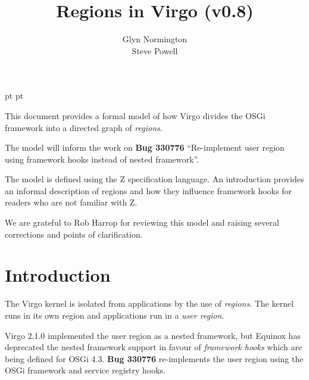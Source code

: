 \documentclass[a4paper,9pt]{article}
\begin{document}
 pt
 pt

\title{Regions in Virgo (v0.8)}
\author{Glyn Normington\\Steve Powell}

\maketitle
\thispagestyle{myheadings}
\setcounter{page}{0}

This document provides a formal model of how Virgo divides the OSGi framework into a directed graph
of \textit{regions}.

The model will inform the work on \textbf{Bug 330776} ``Re-implement user region using
framework hooks instead of nested framework''.

The model is defined using the Z specification language. An introduction provides an informal
description of regions and how they influence framework hooks for readers who are not familiar with Z.

We are grateful to Rob Harrop for reviewing this model and raising several corrections and
points of clarification.

\clearpage
{}
\tableofcontents

\newcommand{\true}{true}
\newcommand{\false}{false}
\renewcommand{\emptyset}{\varnothing}
\newcommand{\ModuleDefZero}{ModuleDef_0}
\newcommand{\ModuleDefOne}{ModuleDef_1}
\newcommand{\ModuleDefTwo}{ModuleDef_2}
\newcommand{\ModuleDefThree}{ModuleDef_3}
\newcommand{\ModuleDefFour}{ModuleDef_4}

\clearpage
{}
\section{Introduction}
\label{cha:intro}

The Virgo kernel is isolated from applications by the use of \textit{regions}.
The kernel runs in its own region and applications run in a \textit{user region}.

Virgo 2.1.0 implemented the user region as a nested framework, but Equinox
has deprecated the nested framework support in favour of \textit{framework hooks}
which are being defined for OSGi 4.3.
\textbf{Bug 330776} re-implements the user region using the OSGi framework and service
registry hooks.
\end{document}
